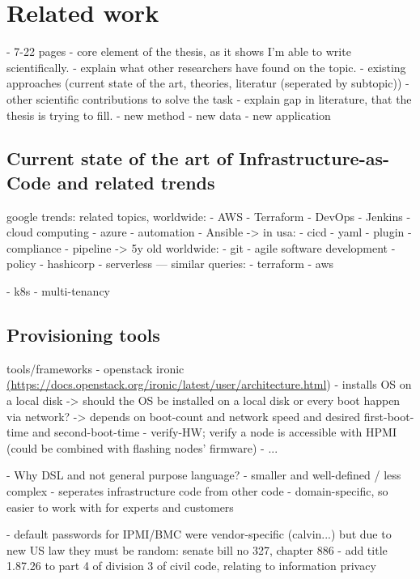\chapter{Related work}

- 7-22 pages
- core element of the thesis, as it shows I'm able to write scientifically.
- explain what other researchers have found on the topic.
  - existing approaches (current state of the art, theories, literatur (seperated by subtopic))
  - other scientific contributions to solve the task
- explain gap in literature, that the thesis is trying to fill.
  - new method
  - new data
  - new application




\section{Current state of the art of Infrastructure-as-Code and related trends} %
google trends: %
related topics, worldwide:
- AWS
- Terraform
- DevOps
- Jenkins
- cloud computing
- azure
- automation
- Ansible
-> in usa:
- cicd
- yaml
- plugin
- compliance
- pipeline
-> 5y old worldwide:
- git
- agile software development
- policy
- hashicorp
- serverless
---
similar queries:
- terraform
- aws


- k8s
- multi-tenancy


\section{Provisioning tools}


tools/frameworks
- openstack ironic \url{(https://docs.openstack.org/ironic/latest/user/architecture.html})
  - installs OS on a local disk
    -> should the OS be installed on a local disk or every boot happen via network?
      -> depends on boot-count and network speed and desired first-boot-time and second-boot-time
  - verify-HW; verify a node is accessible with HPMI (could be combined with flashing nodes' firmware)
- ...

- Why DSL and not general purpose language?
  - smaller and well-defined / less complex
  - seperates infrastructure code from other code
  - domain-specific, so easier to work with for experts and customers

- default passwords for IPMI/BMC were vendor-specific (calvin...) but due to new US law they must be random:
  senate bill no 327, chapter 886 - add title 1.87.26 to part 4 of division 3 of civil code, relating to information privacy


